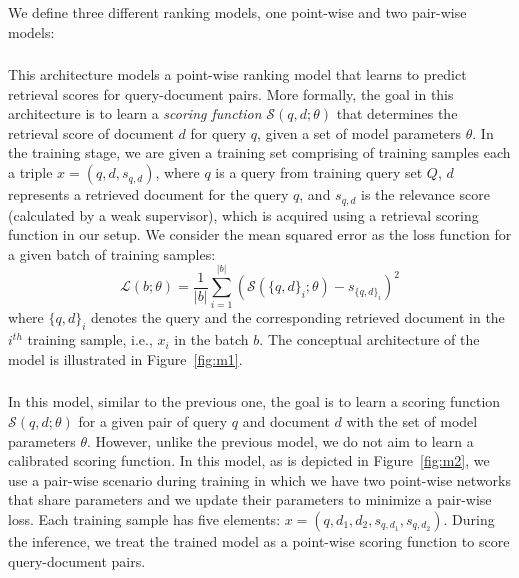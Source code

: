 We define three different ranking models, one point-wise and two pair-wise models:

\subsubsection{\label{sec:modelone}\ModelOne} 
This architecture models a point-wise ranking model that learns to predict retrieval scores for query-document pairs. More formally, the goal in this architecture is to learn a \emph{scoring function} $\mathcal{S}(q, d; \theta)$ that determines the retrieval score of document $d$ for query $q$, given a set of model parameters $\theta$.
%
In the training stage, we are given a training set comprising of training samples each a triple $x = (q,d, s_{q,d})$, where $q$ is a query from training query set $Q$, $d$ represents a retrieved document for the query $q$, and $s_{q,d}$ is the relevance score (calculated by a weak supervisor), which is acquired using a retrieval scoring function in our setup.
%
We consider the mean squared error as the loss function for a given batch of training samples:
\begin{equation}
\mathcal{L}(b; \theta) = \frac{1}{|b|} \sum_{i=1}^{|b|}{(\mathcal{S}(\{q, d\}_i; \theta) - s_{\{q, d\}_i})^2}
\end{equation}
where $\{q, d\}_i$ denotes the query and the corresponding retrieved document in the $i^{th}$ training sample, i.e., $x_i$ in the batch $b$.
The conceptual architecture of the model is illustrated in Figure~\ref{fig:m1}.


\subsubsection{\label{sec:modeltwo}\ModelTwo}
In this model, similar to the previous one, the goal is to learn a scoring function $\mathcal{S}(q, d; \theta)$ for a given pair of query $q$ and document $d$ with the set of model parameters $\theta$. 
However, unlike the previous model, we do not aim to learn a calibrated scoring function. 
In this model, as is depicted in Figure~\ref{fig:m2}, we use a pair-wise scenario during training in which we have two point-wise networks that share parameters and we update their parameters to minimize a pair-wise loss.
Each training sample has five elements: $x = (q,d_1, d_2, s_{q,d_1}, s_{q,d_2})$.
During the inference, we treat the trained model as a point-wise scoring function to score query-document pairs.

